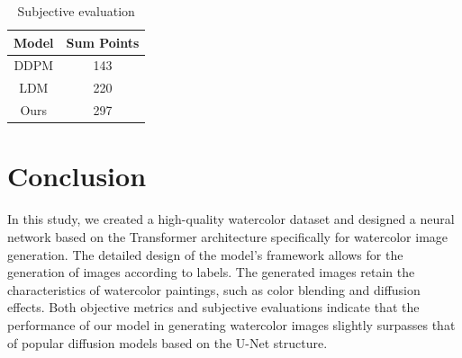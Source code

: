 \documentclass{acsman}
\begin{document}
\begin{table}[htbp]
  \centering
  \caption{Subjective evaluation}
  \label{tab:point}
  \begin{tabular}{c c}
    \hline
    Model & Sum Points  \\
    \hline
    DDPM & 143  \\
    LDM & 220  \\
    Ours & 297  \\
    \hline
  \end{tabular}
\end{table}

\section{Conclusion}
In this study, we created a high-quality watercolor dataset and designed a neural network based on the Transformer architecture specifically for watercolor image generation. The detailed design of the model's framework allows for the generation of images according to labels. The generated images retain the characteristics of watercolor paintings, such as color blending and diffusion effects. Both objective metrics and subjective evaluations indicate that the performance of our model in generating watercolor images slightly surpasses that of popular diffusion models based on the U-Net structure.




\end{document}
